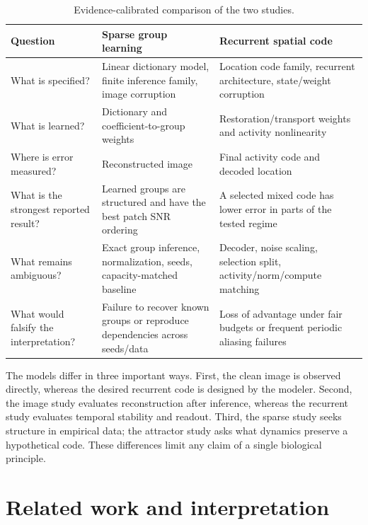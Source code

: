 \begin{table}[htbp]
\centering
\caption{Evidence-calibrated comparison of the two studies.}
\label{tab:synthesis-comparison}
\begin{tabularx}{\textwidth}{@{}>{\raggedright\arraybackslash}p{}>{\raggedright\arraybackslash}X>{\raggedright\arraybackslash}X@{}}
\toprule
Question & Sparse group learning & Recurrent spatial code \\
\midrule
What is specified? & Linear dictionary model, finite inference family, image corruption & Location code family, recurrent architecture, state/weight corruption \\
What is learned? & Dictionary and coefficient-to-group weights & Restoration/transport weights and activity nonlinearity \\
Where is error measured? & Reconstructed image & Final activity code and decoded location \\
What is the strongest reported result? & Learned groups are structured and have the best patch SNR ordering & A selected mixed code has lower error in parts of the tested regime \\
What remains ambiguous? & Exact group inference, normalization, seeds, capacity-matched baseline & Decoder, noise scaling, selection split, activity/norm/compute matching \\
What would falsify the interpretation? & Failure to recover known groups or reproduce dependencies across seeds/data & Loss of advantage under fair budgets or frequent periodic aliasing failures \\
\bottomrule
\end{tabularx}
\end{table}

The models differ in three important ways. First, the clean image is observed directly, whereas the desired recurrent code is designed by the modeler. Second, the image study evaluates reconstruction after inference, whereas the recurrent study evaluates temporal stability and readout. Third, the sparse study seeks structure in empirical data; the attractor study asks what dynamics preserve a hypothetical code. These differences limit any claim of a single biological principle.

\section{Related work and interpretation}
\label{sec:synthesis-later-work}

